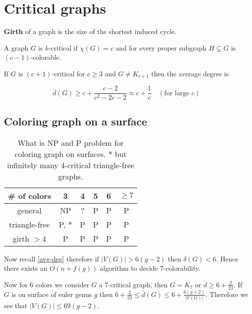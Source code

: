 \chapter{Critical graphs}

\begin{defn}
	\textbf{Girth} of a graph is the size of the shortest induced cycle.
\end{defn}

\begin{defn}
	A graph $G$ is $k$-critical if $\chi(G) = c$ and for every proper subgraph $H \subsetneq G$ is $(c-1)$-colorable.
\end{defn}


\begin{thm}
	If $G$ is $(c+1)$-critical for $c \geq 3$ and $G \neq K_{c+1}$ then the average degree is
	
	$$
	\bar{d}(G) \geq c + \frac{c-2}{c^2 - 2c -2} \approx c + \frac{1}{c} \quad (\text{for large } c)
	$$
\end{thm}

\section{Coloring graph on a surface}

\begin{table}[!ht]\centering
	\begin{tabular}{c|c|c|c|c|c}
		\# of colors & 3 & 4 & 5 & 6 & $\geq 7$ \\
		\hline
		general & NP & ? & P & P & P \\
		triangle-free & P, $\ast$ & P & P & P & P \\
		girth $> 4$ & P & P & P & P & P
	\end{tabular}
	\caption{What is NP and P problem for coloring graph on surfaces. \small{$\ast$ but infinitely many 4-critical triangle-free graphs.}}
\end{table}

\begin{observ}
	Now recall \ref{avg-deg} therefore if $|V(G)| > 6(g-2)$ then $\delta(G) < 6$. Hence there exists an $O(n + f(g))$ algorithm to decide 7-colorability.
\end{observ}

Now for 6 colors we consider $G$ a 7-critical graph, then $G = K_7$ or $\bar{d} \geq 6 + \frac{2}{23}$. If $G$ is on surface of euler genus $g$ then $6 + \frac{2}{23} \leq \bar{d}(G) \leq 6 + \frac{6(g+2)}{|V(G)|}$. Therefore we see that $|V(G)| \leq 69(g-2)$.

